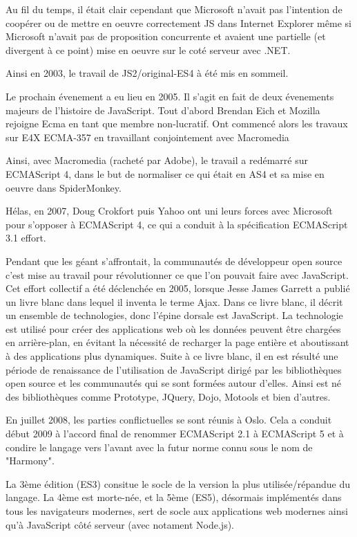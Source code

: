 Au fil du temps, il était clair cependant que Microsoft n’avait pas l’intention de coopérer ou de mettre en oeuvre correctement JS dans Internet Explorer même si Microsoft n’avait pas de proposition concurrente et avaient une partielle (et divergent à ce point) mise en oeuvre sur le coté serveur avec .NET.

Ainsi en 2003, le travail de JS2/original-ES4 à été mis en sommeil.

Le prochain évenement a eu lieu en 2005. Il s’agit en fait de deux évenements majeurs de l’histoire de JavaScript. Tout d’abord Brendan Eich et Mozilla rejoigne Ecma en tant que membre non-lucratif. Ont commencé alors les travaux sur E4X ECMA-357 en travaillant conjointement avec Macromedia

Ainsi, avec Macromedia (racheté par Adobe), le travail a redémarré sur ECMAScript 4, dans le but de normaliser ce qui était en AS4 et sa mise en oeuvre dans SpiderMonkey.

Hélas, en 2007, Doug Crokfort puis Yahoo ont uni leurs forces avec Microsoft pour s’opposer à ECMAScript 4, ce qui a conduit à la spécification ECMAScript 3.1 effort.

Pendant que les géant s’affrontait, la communautés de développeur open source c’est mise au travail pour révolutionner ce que l’on pouvait faire avec JavaScript. Cet effort collectif a été déclenchée en 2005, lorsque Jesse James Garrett a publié un livre blanc dans lequel il inventa le terme Ajax. Dans ce livre blanc, il décrit un ensemble de technologies, donc l’épine dorsale est JavaScript. La technologie est utilisé pour créer des applications web où les données peuvent être chargées en arrière-plan, en évitant la nécessité de recharger la page entière et aboutissant à des applications plus dynamiques. Suite à ce livre blanc, il en est résulté une période de renaissance de l’utilisation de JavaScript dirigé par les bibliothèques open source et les communautés qui se sont formées autour d’elles. Ainsi est né des bibliothèques comme Prototype, JQuery, Dojo, Motools et bien d’autres.

En juillet 2008, les parties conflictuelles se sont réunis à Oslo. Cela a conduit début 2009 à l’accord final de renommer ECMAScript 2.1 à ECMAScript 5 et à condire le langage vers l’avant avec la futur norme connu sous le nom de "Harmony".


La 3ème édition (ES3) consitue le socle de la version la plus utilisée/répandue du langage. La 4ème est morte-née, et la 5ème (ES5), désormais implémentés dans tous les navigateurs modernes, sert de socle aux applications web modernes ainsi qu’à JavaScript côté serveur (avec notament Node.js).

